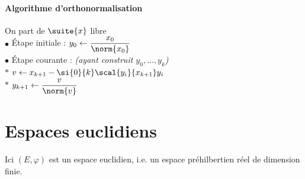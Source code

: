 		\paragraph{Algorithme d'orthonormalisation}  On part de $\suite{x}$ libre \vspace*{0.2cm} \\
		\hspace*{2cm}$\bullet$ Étape initiale : $y_0 \leftarrow \dfrac{x_0}{\norm{x_0}}$ \\
		\hspace*{2cm}$\bullet$ Étape courante : \textit{(ayant construit $y_0,\dots ,y_k$)}\\
		\hspace*{3cm} $\ast$ $v\leftarrow x_{k+1} - \si{0}{k}\scal{y_i}{x_{k+1}} y_i$\\
		\hspace*{3cm} $\ast$ $y_{k+1} \leftarrow \dfrac{v}{\norm{v}}$
	\section{Espaces euclidiens}
		Ici $(E,\varphi)$ est un espace euclidien, i.e. un espace préhilbertien réel de dimension finie.
